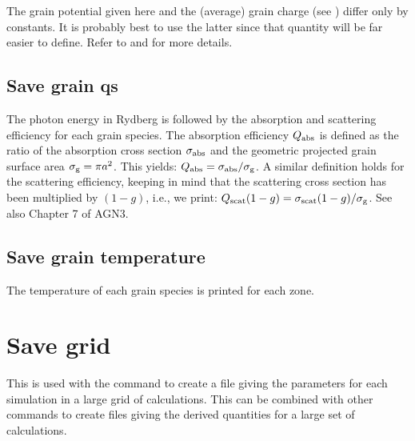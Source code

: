 The grain potential given here and the (average) grain charge
(see ) differ only by constants.  It
is probably best to use the latter since that quantity will be far easier
to define. Refer to \citet{Weingartner2001a} and
\citet{VanHoof2004}
for more details.

\subsection{Save grain qs}

The photon energy in Rydberg is followed by the absorption and scattering
efficiency for each grain species. The absorption efficiency $Q_{\rm abs}$ is
defined as the ratio of the absorption cross section $\sigma_{\rm abs}$ and
the geometric projected grain surface area $\sigma_{\rm g} = \pi a^2$. This
yields: $Q_{\rm abs} = \sigma_{\rm abs}/\sigma_{\rm g}$. A similar definition
holds for the scattering efficiency, keeping in mind that the scattering cross
section has been multiplied by $(1-g)$, i.e., we print: $Q_{\rm scat} (1-g) =
\sigma_{\rm scat} (1-g) / \sigma_{\rm g}$. See also Chapter 7 of AGN3.

\subsection{Save grain temperature}

The temperature of each grain species is printed for each zone.

\section{Save grid}
\label{sec:save:grid}

This is used with the  command to
create a file giving the parameters for each simulation in a large grid
of calculations.  This can be combined with other  commands to create
files giving the derived quantities for a large set of calculations.

